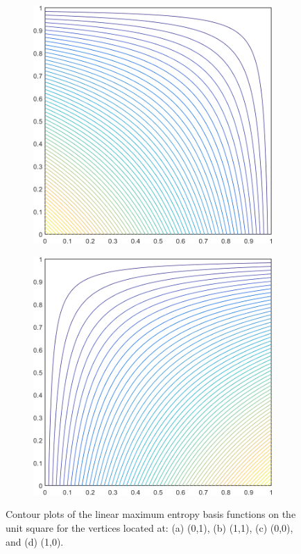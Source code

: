 \begin{figure}
\begin{subfigure}[b]{0.39\textwidth}
		\caption{}
	\end{subfigure}
	\vfill
	\begin{subfigure}[b]{0.39\textwidth}
		\centering
		\includegraphics[width=\textwidth]{figures/sec_BF/square_MAXENT1_contour_b1.png}
		\caption{}
	\end{subfigure}
	\hspace{1.5cm}
	\begin{subfigure}[b]{0.39\textwidth}
		\centering
		\includegraphics[width=\textwidth]{figures/sec_BF/square_MAXENT1_contour_b2.png}
		\caption{}
	\end{subfigure}
\caption{Contour plots of the linear maximum entropy basis functions on the unit square for the vertices located at: (a) (0,1), (b) (1,1), (c) (0,0), and (d) (1,0).}
\end{figure}

